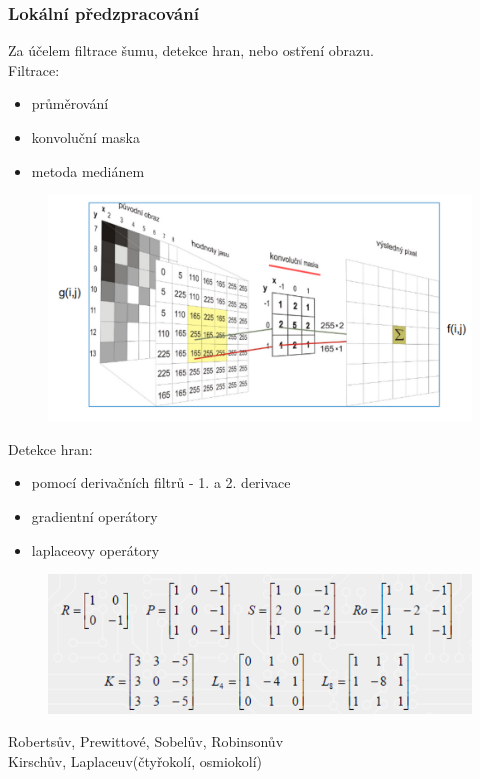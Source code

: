 \subsubsection*{Lokální předzpracování}
Za účelem filtrace šumu, detekce hran, nebo ostření obrazu.\\
Filtrace:
\begin{itemize}
    \item průměrování
    \item konvoluční maska
    \item metoda mediánem
\end{itemize}
\begin{figure}[H]
    \includegraphics[scale = 0.25]{images/konvoluce_maska.png}
\end{figure}

Detekce hran:
\begin{itemize}
    \item pomocí derivačních filtrů - 1. a 2. derivace
    \item gradientní operátory
    \item laplaceovy operátory
\end{itemize}
\begin{figure}[H]
    \includegraphics[scale = 0.7]{images/hrany.png}
\end{figure}
Robertsův, Prewittové, Sobelův, Robinsonův\\
Kirschův, Laplaceuv(čtyřokolí, osmiokolí)\\

